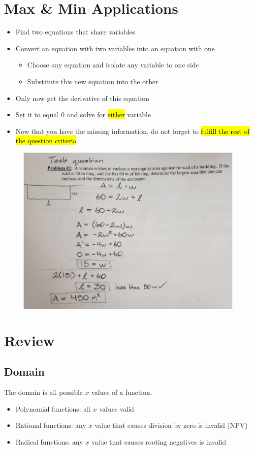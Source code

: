 \documentclass[a4paper,12pt]{article}
\begin{document}
\section{Max \& Min Applications}
\begin{itemize}
    \item{Find two equations that share variables}
    \item{
        Convert an equation with two variables into an equation with one
        \begin{itemize}
            \item{Choose any equation and isolate any variable to one side}
            \item{Substitute this new equation into the other}
        \end{itemize}
    }
    \item{Only now get the derivative of this equation}
    \item{Set it to equal $0$ and solve for \hl{either} variable}
    \item{Now that you have the missing information, do not forget to \hl{fulfill the rest of the question criteria}}
\end{itemize}

\begin{figure}[H]
    \centering
    \includegraphics[width=\textwidth]{maxminapp}
\end{figure}

\section{Review}
\subsection{Domain}
The domain is all possible $x$ values of a function.
\begin{itemize}
    \item{Polynomial functions: all $x$ values valid}
    \item{Rational functions: any $x$ value that causes division by zero is invalid (NPV)}
    \item{Radical functions: any $x$ value that causes rooting negatives is invalid}
\end{itemize}
\end{document}
